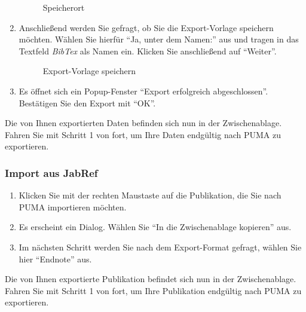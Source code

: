 \begin{enumerate}
\begin{figure}[h!]
 \centering
 \caption{Speicherort}
 \label{fig:speicherort}
\end{figure}
    \item Anschließend werden Sie gefragt, ob Sie die Export-Vorlage speichern möchten. Wählen Sie hierfür \enquote{Ja, unter dem Namen:} aus und tragen in das Textfeld \textit{BibTex} als Namen ein. Klicken Sie anschließend auf \enquote{Weiter}.
   
\begin{figure}[h!]
 \centering
 \caption{Export-Vorlage speichern}
 \label{fig:exportVorlageSpeichern}
\end{figure}
    \item Es öffnet sich ein Popup-Fenster \enquote{Export erfolgreich abgeschlossen}. Bestätigen Sie den Export mit \enquote{OK}.
\end{enumerate}
Die von Ihnen exportierten Daten befinden sich nun in der Zwischenablage. Fahren Sie mit Schritt 1 von  fort, um Ihre Daten endgültig nach PUMA zu exportieren.\newline

\subsubsection{Import aus JabRef}\label{sss:importJabRef}
\begin{enumerate}
    \item Klicken Sie mit der rechten Maustaste auf die Publikation, die Sie nach PUMA importieren möchten.
    \item Es erscheint ein Dialog. Wählen Sie \enquote{In die Zwischenablage kopieren} aus.
    \item Im nächsten Schritt werden Sie nach dem Export-Format gefragt, wählen Sie hier \enquote{Endnote} aus.
\end{enumerate}
Die von Ihnen exportierte Publikation befindet sich nun in der Zwischenablage. Fahren Sie mit Schritt 1 von  fort, um Ihre Publikation endgültig nach PUMA zu exportieren.

